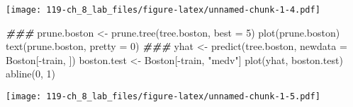 \documentclass[
]{book}
\newenvironment{Shaded}{\begin{snugshade}}{\end{snugshade}}
\newcommand{\AttributeTok}[1]{\textcolor[rgb]{0.77,0.63,0.00}{#1}}
\newcommand{\DecValTok}[1]{\textcolor[rgb]{0.00,0.00,0.81}{#1}}
\newcommand{\DocumentationTok}[1]{\textcolor[rgb]{0.56,0.35,0.01}{\textbf{\textit{#1}}}}
\newcommand{\FunctionTok}[1]{\textcolor[rgb]{0.00,0.00,0.00}{#1}}
\newcommand{\NormalTok}[1]{#1}
\newcommand{\OtherTok}[1]{\textcolor[rgb]{0.56,0.35,0.01}{#1}}
\newcommand{\SpecialCharTok}[1]{\textcolor[rgb]{0.00,0.00,0.00}{#1}}
\newcommand{\StringTok}[1]{\textcolor[rgb]{0.31,0.60,0.02}{#1}}
\begin{document}
\texttt{[image: 119-ch\_8\_lab\_files/figure-latex/unnamed-chunk-1-4.pdf]}

\begin{Shaded}
\begin{Highlighting}[]
\DocumentationTok{\#\#\#}
\NormalTok{prune.boston }\OtherTok{\textless{}{-}} \FunctionTok{prune.tree}\NormalTok{(tree.boston, }\AttributeTok{best =} \DecValTok{5}\NormalTok{)}
\FunctionTok{plot}\NormalTok{(prune.boston)}
\FunctionTok{text}\NormalTok{(prune.boston, }\AttributeTok{pretty =} \DecValTok{0}\NormalTok{)}
\DocumentationTok{\#\#\#}
\NormalTok{yhat }\OtherTok{\textless{}{-}} \FunctionTok{predict}\NormalTok{(tree.boston, }\AttributeTok{newdata =}\NormalTok{ Boston[}\SpecialCharTok{{-}}\NormalTok{train, ])}
\NormalTok{boston.test }\OtherTok{\textless{}{-}}\NormalTok{ Boston[}\SpecialCharTok{{-}}\NormalTok{train, }\StringTok{"medv"}\NormalTok{]}
\FunctionTok{plot}\NormalTok{(yhat, boston.test)}
\FunctionTok{abline}\NormalTok{(}\DecValTok{0}\NormalTok{, }\DecValTok{1}\NormalTok{)}
\end{Highlighting}
\end{Shaded}

\texttt{[image: 119-ch\_8\_lab\_files/figure-latex/unnamed-chunk-1-5.pdf]}
\end{document}
